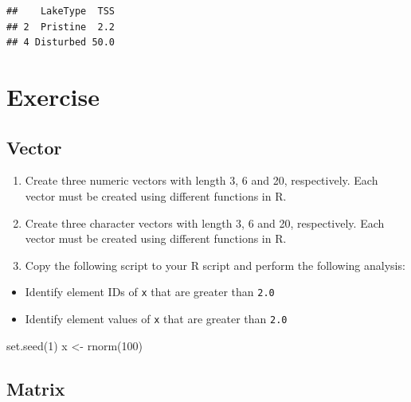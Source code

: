 \documentclass[
]{book}
\newenvironment{Shaded}{\begin{snugshade}}{\end{snugshade}}
\newcommand{\DecValTok}[1]{\textcolor[rgb]{0.00,0.00,0.81}{#1}}
\newcommand{\FunctionTok}[1]{\textcolor[rgb]{0.00,0.00,0.00}{#1}}
\newcommand{\NormalTok}[1]{#1}
\newcommand{\OtherTok}[1]{\textcolor[rgb]{0.56,0.35,0.01}{#1}}
\providecommand{\tightlist}{%
  \setlength{\itemsep}{0pt}\setlength{\parskip}{0pt}}
\begin{document}
\begin{verbatim}
##    LakeType  TSS
## 2  Pristine  2.2
## 4 Disturbed 50.0
\end{verbatim}

\hypertarget{exercise}{%
\section{Exercise}\label{exercise}}

\hypertarget{vector-1}{%
\subsection{Vector}\label{vector-1}}

\begin{enumerate}
\def\labelenumi{\alph{enumi}.}
\tightlist
\item
  Create three numeric vectors with length 3, 6 and 20, respectively. Each vector must be created using different functions in R.
\item
  Create three character vectors with length 3, 6 and 20, respectively. Each vector must be created using different functions in R.
\item
  Copy the following script to your R script and perform the following analysis:
\end{enumerate}

\begin{itemize}
\tightlist
\item
  Identify element IDs of \texttt{x} that are greater than \texttt{2.0}
\item
  Identify element values of \texttt{x} that are greater than \texttt{2.0}
\end{itemize}

\begin{Shaded}
\begin{Highlighting}[]
\FunctionTok{set.seed}\NormalTok{(}\DecValTok{1}\NormalTok{)}
\NormalTok{x }\OtherTok{\textless{}{-}} \FunctionTok{rnorm}\NormalTok{(}\DecValTok{100}\NormalTok{)}
\end{Highlighting}
\end{Shaded}

\hypertarget{matrix-1}{%
\subsection{Matrix}\label{matrix-1}}
\end{document}
